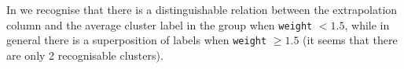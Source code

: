 In  we recognise that there is a distinguishable relation
between the extrapolation column and the average cluster label in the group
when \texttt{weight} $< 1.5$, while in general there is a superposition of
labels when \texttt{weight} $\ge 1.5$ (it seems that there are only 2
recognisable clusters).

